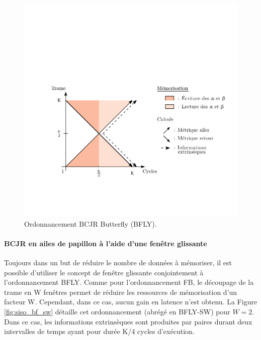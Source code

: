 \begin{figure}[h]
	\centering
	\includegraphics{main/ch4_fig/ipe/BFLY+LEG.pdf}
	\caption{Ordonnancement BCJR Butterfly (BFLY). \label{fig:siso_but}}
\end{figure}

\paragraph*{BCJR en ailes de papillon à l'aide d'une fenêtre glissante}
Toujours dans un but de réduire le nombre de données à mémoriser, il est possible d'utiliser le concept de fenêtre 
glissante conjointement à l'ordonnancement BFLY. Comme pour l'ordonnancement FB, le découpage de la trame en W fenêtres 
permet de réduire les ressources de mémorisation d'un facteur W. Cependant, dans ce cas, aucun gain en latence n'est obtenu. La Figure \ref{fig:siso_bf_sw} détaille cet ordonnancement (abrégé en BFLY-SW) pour $W = 2$. Dans ce cas, 
les informations extrinsèques sont produites par paires durant deux intervalles de temps ayant pour durée K/4 cycles 
d'exécution.



